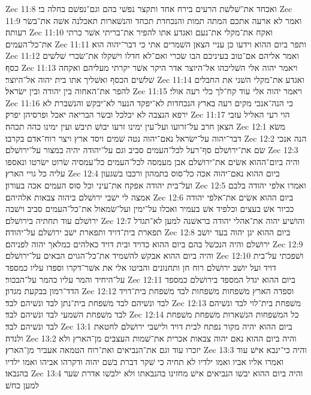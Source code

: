 Zec 11:8  ואכחד את־שׁלשׁת הרעים בירח אחד ותקצר נפשׁי בהם וגם־נפשׁם בחלה בי׃
Zec 11:9  ואמר לא ארעה אתכם המתה תמות והנכחדת תכחד והנשׁארות תאכלנה אשׁה את־בשׂר רעותה׃
Zec 11:10  ואקח את־מקלי את־נעם ואגדע אתו להפיר את־בריתי אשׁר כרתי את־כל־העמים׃
Zec 11:11  ותפר ביום ההוא וידעו כן עניי הצאן השׁמרים אתי כי דבר־יהוה הוא׃
Zec 11:12  ואמר אליהם אם־טוב בעיניכם הבו שׂכרי ואם־לא חדלו וישׁקלו את־שׂכרי שׁלשׁים כסף׃
Zec 11:13  ויאמר יהוה אלי השׁליכהו אל־היוצר אדר היקר אשׁר יקרתי מעליהם ואקחה שׁלשׁים הכסף ואשׁליך אתו בית יהוה אל־היוצר׃
Zec 11:14  ואגדע את־מקלי השׁני את החבלים להפר את־האחוה בין יהודה ובין ישׂראל׃
Zec 11:15  ויאמר יהוה אלי עוד קח־לך כלי רעה אולי׃
Zec 11:16  כי הנה־אנכי מקים רעה בארץ הנכחדות לא־יפקד הנער לא־יבקשׁ והנשׁברת לא ירפא הנצבה לא יכלכל ובשׂר הבריאה יאכל ופרסיהן יפרק׃
Zec 11:17  הוי רעי האליל עזבי הצאן חרב על־זרועו ועל־עין ימינו זרעו יבושׁ תיבשׁ ועין ימינו כהה תכהה׃
Zec 12:1  משׂא דבר־יהוה על־ישׂראל נאם־יהוה נטה שׁמים ויסד ארץ ויצר רוח־אדם בקרבו׃
Zec 12:2  הנה אנכי שׂם את־ירושׁלם סף־רעל לכל־העמים סביב וגם על־יהודה יהיה במצור על־ירושׁלם׃
Zec 12:3  והיה ביום־ההוא אשׂים את־ירושׁלם אבן מעמסה לכל־העמים כל־עמסיה שׂרוט ישׂרטו ונאספו עליה כל גויי הארץ׃
Zec 12:4  ביום ההוא נאם־יהוה אכה כל־סוס בתמהון ורכבו בשׁגעון ועל־בית יהודה אפקח את־עיני וכל סוס העמים אכה בעורון׃
Zec 12:5  ואמרו אלפי יהודה בלבם אמצה לי ישׁבי ירושׁלם ביהוה צבאות אלהיהם׃
Zec 12:6  ביום ההוא אשׂים את־אלפי יהודה ככיור אשׁ בעצים וכלפיד אשׁ בעמיר ואכלו על־ימין ועל־שׂמאול את־כל־העמים סביב וישׁבה ירושׁלם עוד תחתיה בירושׁלם׃
Zec 12:7  והושׁיע יהוה את־אהלי יהודה בראשׁנה למען לא־תגדל תפארת בית־דויד ותפארת ישׁב ירושׁלם על־יהודה׃
Zec 12:8  ביום ההוא יגן יהוה בעד יושׁב ירושׁלם והיה הנכשׁל בהם ביום ההוא כדויד ובית דויד כאלהים כמלאך יהוה לפניהם׃
Zec 12:9  והיה ביום ההוא אבקשׁ להשׁמיד את־כל־הגוים הבאים על־ירושׁלם׃
Zec 12:10  ושׁפכתי על־בית דויד ועל יושׁב ירושׁלם רוח חן ותחנונים והביטו אלי את אשׁר־דקרו וספדו עליו כמספד על־היחיד והמר עליו כהמר על־הבכור׃
Zec 12:11  ביום ההוא יגדל המספד בירושׁלם כמספד הדד־רמון בבקעת מגדון׃
Zec 12:12  וספדה הארץ משׁפחות משׁפחות לבד משׁפחת בית־דויד לבד ונשׁיהם לבד משׁפחת בית־נתן לבד ונשׁיהם לבד׃
Zec 12:13  משׁפחת בית־לוי לבד ונשׁיהם לבד משׁפחת השׁמעי לבד ונשׁיהם לבד׃
Zec 12:14  כל המשׁפחות הנשׁארות משׁפחת משׁפחת לבד ונשׁיהם לבד׃
Zec 13:1  ביום ההוא יהיה מקור נפתח לבית דויד ולישׁבי ירושׁלם לחטאת ולנדה׃
Zec 13:2  והיה ביום ההוא נאם יהוה צבאות אכרית את־שׁמות העצבים מן־הארץ ולא יזכרו עוד וגם את־הנביאים ואת־רוח הטמאה אעביר מן־הארץ׃
Zec 13:3  והיה כי־ינבא אישׁ עוד ואמרו אליו אביו ואמו ילדיו לא תחיה כי שׁקר דברת בשׁם יהוה ודקרהו אביהו ואמו ילדיו בהנבאו׃
Zec 13:4  והיה ביום ההוא יבשׁו הנביאים אישׁ מחזינו בהנבאתו ולא ילבשׁו אדרת שׂער למען כחשׁ׃

